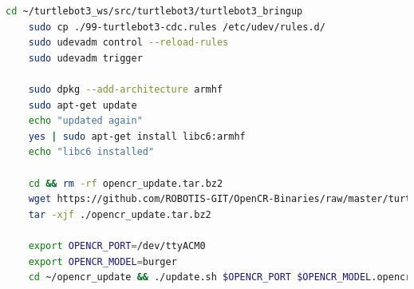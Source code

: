 \documentclass[10pt,a4paper]{report}
\begin{document}
\begin{lstlisting}[language=BASH]
	cd ~/turtlebot3_ws/src/turtlebot3/turtlebot3_bringup
	sudo cp ./99-turtlebot3-cdc.rules /etc/udev/rules.d/
	sudo udevadm control --reload-rules
	sudo udevadm trigger
	
	sudo dpkg --add-architecture armhf
	sudo apt-get update
	echo "updated again"
	yes | sudo apt-get install libc6:armhf
	echo "libc6 installed"
	
	cd && rm -rf opencr_update.tar.bz2
	wget https://github.com/ROBOTIS-GIT/OpenCR-Binaries/raw/master/turtlebot3/ROS2/latest/opencr_update.tar.bz2
	tar -xjf ./opencr_update.tar.bz2
	
	export OPENCR_PORT=/dev/ttyACM0
	export OPENCR_MODEL=burger
	cd ~/opencr_update && ./update.sh $OPENCR_PORT $OPENCR_MODEL.opencr
\end{lstlisting}

\nocite{*}


\end{document}
